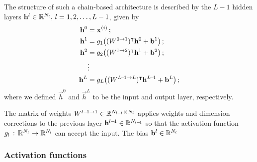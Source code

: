     The structure of such a chain-based architecture is described by the $L-1$ hidden layers $\vec{h}^l \in \RR[N_l],\,l=1,2, \dots, L-1$, given by
    \begin{subequations}\label{eq:nn_layers}
        \begin{align} 
            \vec{h}^0 &= \vec{x}^{(i)}\,; \\%
            \vec{h}^1 &= g_1 \big((W^{0\to 1})\TT \vec{h}^0 + \vec{b}^1\big)\,; \\
            \vec{h}^2 &= g_2 \big( (W^{1\to 2})\TT \vec{h}^1 + \vec{b}^2\big)\,; \\
            &\vdots \nonumber \\
            \vec{h}^{L} &= g_L \big((W^{{L\!-\!1\to L}})\TT \vec{h}^{L\!-\! 1} + \vec{b}^L\big)\,;             
        \end{align}
    \end{subequations}
    where we defined $\vec{h}^0$ and $\vec{h}^L$ to be the input and output layer, respectively. 

    The matrix of weights $W^{l-\! 1\to 1} \in \RR[N_{l-\!1} \cross N_l]$ applies weights and dimension corrections to the previous layer $\vec{h}^{l-\! 1}\in \RR[N_{l-\! 1}]$ so that the activation function $g_l \,:\, \RR[N_l] \to \RR[N_l]$ can accept the input.  The bias $\vec{b}^l \in \RR[N_l]$ \wtf

   



    \subsubsection{Activation functions}\label{sec:activation_function}

    



